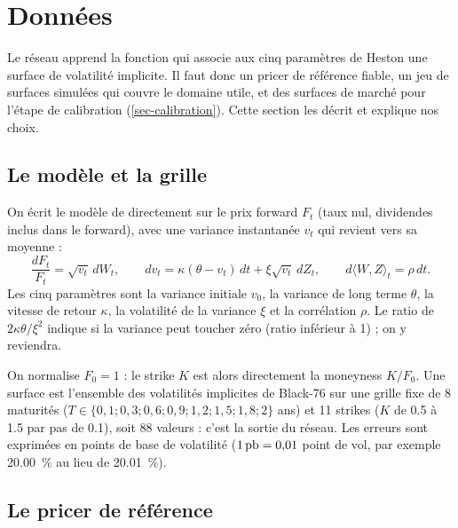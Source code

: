 
\section{Données}
\label{sec-donnees}

Le réseau apprend la fonction qui associe aux cinq paramètres de Heston une surface de volatilité implicite.
Il faut donc un pricer de référence fiable, un jeu de surfaces simulées qui couvre le domaine utile, et des
surfaces de marché pour l'étape de calibration (\cref{sec-calibration}). Cette section les décrit et explique nos
choix.

\subsection{Le modèle et la grille}
\label{sec-modele}

On écrit le modèle de \citet{heston1993} directement sur le prix forward $F_t$ (taux nul, dividendes inclus dans
le forward), avec une variance instantanée $v_t$ qui revient vers sa moyenne :
\begin{equation}
  \frac{dF_t}{F_t} = \sqrt{v_t}\, dW_t, \qquad
  dv_t = \kappa(\theta - v_t)\, dt + \xi \sqrt{v_t}\, dZ_t, \qquad
  d\langle W, Z\rangle_t = \rho\, dt .
  \label{eq-heston}
\end{equation}
Les cinq paramètres sont la variance initiale $v_0$, la variance de long terme $\theta$, la vitesse de retour
$\kappa$, la volatilité de la variance $\xi$ et la corrélation $\rho$. Le ratio de \citet{feller1951}
$2\kappa\theta/\xi^2$ indique si la variance peut toucher zéro (ratio inférieur à 1) ; on y reviendra.

On normalise $F_0 = 1$ : le strike $K$ est alors directement la moneyness $K/F_0$. Une surface est l'ensemble des
volatilités implicites de Black-76 \citep{black1976} sur une grille fixe de
\num{8} maturités ($T \in \{0{,}1 ; 0{,}3 ; 0{,}6 ; 0{,}9 ; 1{,}2 ; 1{,}5 ; 1{,}8 ; 2\}$ ans) et
\num{11} strikes ($K$ de \num{0.5} à \num{1.5} par pas de \num{0.1}), soit \num{88} valeurs : c'est la sortie
du réseau. Les erreurs sont exprimées en points de base de volatilité ($1\,\text{pb} = \num{0.01}$ point de vol,
par exemple \SI{20.00}{\percent} au lieu de \SI{20.01}{\percent}).

\subsection{Le pricer de référence}
\label{sec-pricer}

